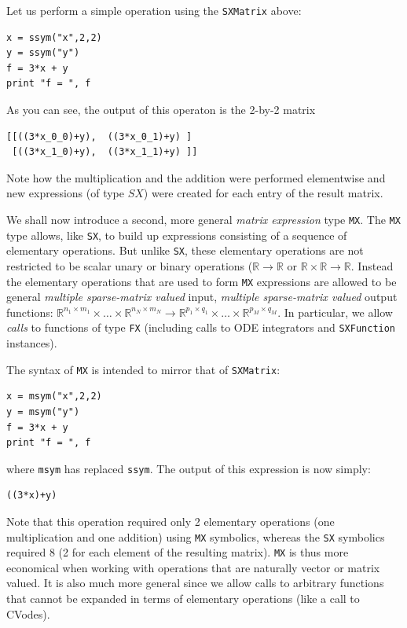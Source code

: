\documentclass[a4paper,12pt]{book}
\begin{document}
{Let us perform a simple operation using the \texttt{SXMatrix} above:
\begin{verbatim}
x = ssym("x",2,2)
y = ssym("y")
f = 3*x + y
print "f = ", f
\end{verbatim}

As you can see, the output of this operaton is the 2-by-2 matrix
\begin{verbatim}
[[((3*x_0_0)+y),  ((3*x_0_1)+y) ]
 [((3*x_1_0)+y),  ((3*x_1_1)+y) ]]
\end{verbatim}

Note how the multiplication and the addition were performed elementwise and new expressions (of type $SX$) were created for each entry of the result matrix.

We shall now introduce a second, more general \emph{matrix expression} type \texttt{MX}. The \texttt{MX} type allows, like \texttt{SX}, to build up expressions consisting of a sequence of elementary operations. But unlike \texttt{SX}, these elementary operations are not restricted to be scalar unary or binary operations ($\mathbb{R} \rightarrow \mathbb{R}$ or $\mathbb{R} \times \mathbb{R} \rightarrow \mathbb{R}$. Instead the elementary operations that are used to form \texttt{MX} expressions are allowed to be general \emph{multiple sparse-matrix valued} input, \emph{multiple sparse-matrix valued} output functions: $\mathbb{R}^{n_1 \times m_1} \times \ldots \times \mathbb{R}^{n_N \times m_N} \rightarrow \mathbb{R}^{p_1 \times q_1} \times \ldots \times \mathbb{R}^{p_M \times q_M}$. In particular, we allow \emph{calls} to functions of type \texttt{FX} (including calls to ODE integrators and \texttt{SXFunction} instances).

The syntax of \texttt{MX} is intended to mirror that of \texttt{SXMatrix}:
\begin{verbatim}
x = msym("x",2,2)
y = msym("y")
f = 3*x + y
print "f = ", f
\end{verbatim}

where \texttt{msym} has replaced \texttt{ssym}. The output of this expression is now simply:
\begin{verbatim}
((3*x)+y)
\end{verbatim}

Note that this operation required only 2 elementary operations (one multiplication and one addition) using \texttt{MX} symbolics, whereas the \texttt{SX} symbolics required 8 (2 for each element of the resulting matrix). \texttt{MX} is thus more economical when working with operations that are naturally vector or matrix valued. It is also much more general since we allow calls to arbitrary functions that cannot be expanded in terms of elementary operations (like a call to CVodes). %

}
\end{document}
